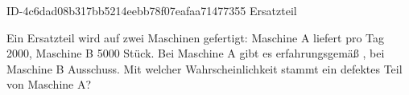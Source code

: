 \begin{exercise}
      {ID-4c6dad08b317bb5214eebb78f07eafaa71477355}
      {Ersatzteil}
  \ifproblem\problem\par
    Ein Ersatzteil wird auf zwei Maschinen gefertigt: Maschine A liefert
    pro Tag 2000, Maschine B 5000 Stück. Bei Maschine A gibt es
    erfahrungsgemäß , bei Maschine B  Ausschuss.
    Mit welcher Wahrscheinlichkeit stammt ein defektes Teil von Maschine A?
  \fi
\end{exercise}
